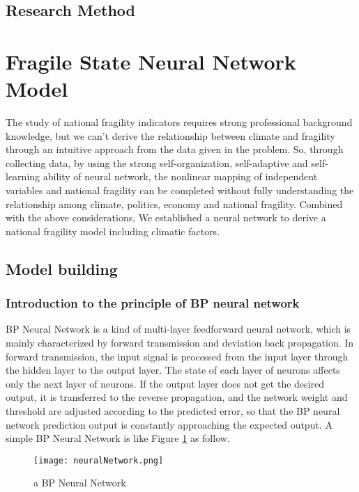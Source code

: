 \documentclass{mcmthesis}
\newcommand{\upcite}[1]{\textsuperscript{\textsuperscript{\cite{#1}}}}
\begin{document}
\subsection{Research Method}






\section{Fragile State Neural Network Model}
The study of national fragility indicators requires strong professional
background knowledge, but we can't derive the relationship between climate
and fragility through an intuitive approach from the data given in the 
problem. So, through collecting data, by using the strong self-organization, 
self-adaptive and self-learning ability of neural network, the nonlinear 
mapping of independent variables and national fragility can be completed 
without fully understanding the relationship among climate, politics, 
economy and national fragility. Combined with the above considerations, 
We established a neural network to derive a national fragility model 
including climatic factors.
\subsection{Model building}
\subsubsection{Introduction to the principle of BP neural network}
BP Neural Network is a kind of multi-layer feedforward neural network, 
which is mainly characterized by forward transmission and deviation back 
propagation. In forward transmission, the input signal is processed from 
the input layer through the hidden layer to the output layer. The state of 
each layer of neurons affects only the next layer of neurons. If the output 
layer does not get the desired output, it is transferred to the reverse 
propagation, and the network weight and threshold are adjusted according 
to the predicted error, so that the BP neural network prediction output 
is constantly approaching the expected output. A simple BP Neural Network 
is like Figure \ref{fig:nn} as follow.\upcite{bib20}
\begin{figure}[h]
\small
\centering
\texttt{[image: neuralNetwork.png]}
\caption{a BP Neural Network} 
\label{fig:nn}
\end{figure}
\end{document}
